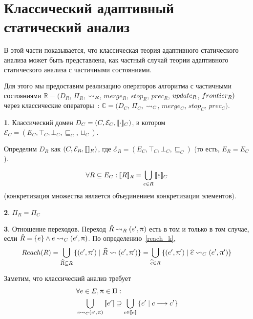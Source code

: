 \section{Классический адаптивный статический анализ}
\label{sect_classic_cpa}

В этой части показывается, что классическая теория адаптивного статического анализа может быть представлена, как частный случай теории адаптивного статического анализа с частичными состояниями.

Для этого мы предоставим реализацию операторов алгоритма с частичными состояниями
$\mathbb{R}=(D_R$, $\Pi_R$, $\leadsto_R$, $merge_R$, $stop_R$, $prec_R$, $update_R$, $frontier_R)$
через классические операторы~\cite{Beyer08}: %
$\mathbb{C} = (D_C$, $\Pi_C$, $\leadsto_C$, $merge_C$, $stop_C$, $prec_C)$.

{\textbf 1.}
Классический домен $D_C=(C,\mathcal{E}_C, [\![ \cdot ]\!]_C)$, в котором
$\mathcal{E}_C=(E_C, \top_C, \bot_C, \sqsubseteq_C, \sqcup_C)$.

Определим $D_R$ как $(C,\mathcal{E}_R, [\![  ]\!]_R)$, где 
$\mathcal{E}_R = (E_C, \top_C, \bot_C, \sqsubseteq_C)$ (то есть, $E_R=E_C$).

\begin{equation}
\label{cpa_classic_conc_eq}
\begin{aligned}
\forall R\subseteq E_C: [\![ R ]\!]_R = \bigcup_{e\in R}{[\![ e ]\!]_C}
\end{aligned}
\end{equation}
(конкретизация множества является объединением конкретизации элементов).

{\textbf 2.} $\Pi_R=\Pi_C$

{\textbf 3.} Отношение переходов.
Переход $\hat R \leadsto_R (e', \uppi)$ есть в том и только в том случае, если
$\hat R = \{e\} \land e \leadsto_C (e',\uppi)$.
По определению~\ref{reach_k}, $$Reach(R) = \bigcup_{\widehat{R} \subseteq R}{\{(e', \uppi') \mid \widehat{R} \leadsto (e', \uppi')\}} = \bigcup_{\widehat{e} \in R}{\{(e', \uppi') \mid \widehat{e} \leadsto_C (e', \uppi')\}}$$

Заметим, что классический анализ требует
\begin{equation}
\label{cpa_classic_transfer_eq}
\begin{aligned}
& \forall e \in E, \uppi \in \Pi: \\
& \bigcup_{e \leadsto_C (e', \uppi)}{[\![ e' ]\!]} \supseteq \bigcup_{c \in [\![ e ]\!]}{\{c' \mid c \longrightarrow c'\}}
\end{aligned}
\end{equation}

